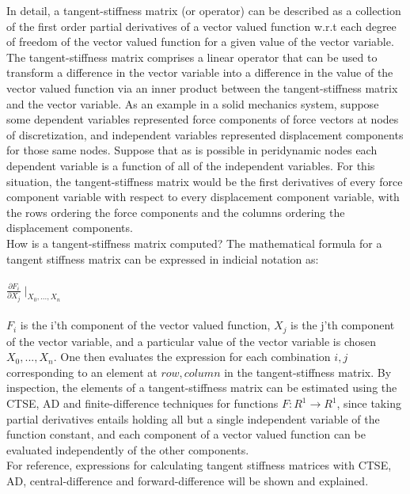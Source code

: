 \documentclass[preprint,12pt]{elsarticle}
\begin{document}
In detail, a tangent-stiffness matrix (or operator) can be described as a collection of the first
order partial derivatives of a vector valued function w.r.t each degree of freedom of the vector
valued function for a given value of the vector variable.  The tangent-stiffness matrix comprises a
linear operator that can be used to transform a difference in the vector variable into a difference
in the value of the vector valued function via an inner product between the tangent-stiffness matrix
and the vector variable.  As an example in a solid mechanics system, suppose some dependent
variables represented force components of force vectors at nodes of discretization, and independent
variables represented displacement components for those same nodes. Suppose that as is possible in
peridynamic nodes each dependent variable is a function of all of the independent variables. For
this situation, the tangent-stiffness matrix would be the first derivatives of every force component
variable with respect to every displacement component variable, with the rows ordering the force
components and the columns ordering the displacement components.  \\

How is a tangent-stiffness matrix computed? The mathematical formula for a tangent stiffness matrix
can be expressed in indicial notation as:\\\\ $\frac{\partial F_i}{\partial X_j}\mid_{X_0,...,X_n}$
\\\\ $F_i$ is the i'th component of the vector valued function, $X_j$ is the j'th component of the
vector variable, and a particular value of the vector variable is chosen $X_0,...,X_n$. One then
evaluates the expression for each combination $i, j$ corresponding to an element at $row, column$ in
the tangent-stiffness matrix. By inspection, the elements of a tangent-stiffness matrix can be
estimated using the CTSE, AD and finite-difference techniques for functions $F:R^1 \rightarrow R^1$,
since taking partial derivatives entails holding all but a single independent variable of the
function constant, and each component of a vector valued function can be evaluated independently of
the other components. \\

For reference, expressions for calculating tangent stiffness matrices with CTSE, AD,
central-difference and forward-difference will be shown and explained.
\end{document}
